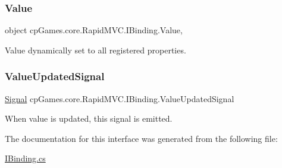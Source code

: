\mbox{\label{interfacecp_games_1_1core_1_1_rapid_m_v_c_1_1_i_binding_a7ec4a6dc07e378d9ffd775b4d6b387f7}} 
\subsubsection{\texorpdfstring{Value}{Value}}
{\footnotesize\ttfamily object cp\+Games.\+core.\+Rapid\+M\+V\+C.\+I\+Binding.\+Value\hspace{0.3cm}{\ttfamily [get]}, {\ttfamily [set]}}



Value dynamically set to all registered properties. 

\mbox{\label{interfacecp_games_1_1core_1_1_rapid_m_v_c_1_1_i_binding_a24032f62e91ba7f08581be9afd09b2c7}} 
\subsubsection{\texorpdfstring{ValueUpdatedSignal}{ValueUpdatedSignal}}
{\footnotesize\ttfamily \mbox{\hyperlink{classcp_games_1_1core_1_1_rapid_m_v_c_1_1_signal}{Signal}} cp\+Games.\+core.\+Rapid\+M\+V\+C.\+I\+Binding.\+Value\+Updated\+Signal\hspace{0.3cm}{\ttfamily [get]}}



When value is updated, this signal is emitted. 



The documentation for this interface was generated from the following file\+:\begin{DoxyCompactItemize}
\item 
\mbox{\hyperlink{_i_binding_8cs}{I\+Binding.\+cs}}\end{DoxyCompactItemize}
